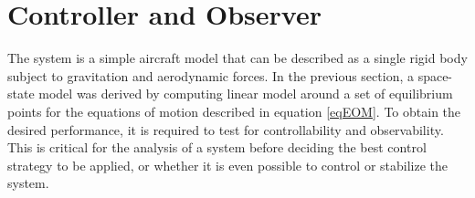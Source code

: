 \documentclass[12pt]{article}
\begin{document}
\section{Controller and Observer}
The system is a simple aircraft model that can be described as a single rigid body subject to gravitation and aerodynamic forces. In the previous section, a space-state model was derived by computing linear model around a set of equilibrium points for the equations of motion described in equation \eqref{eqEOM}. To obtain the desired performance, it is required to test for controllability and observability.  This is critical for the analysis of a system before deciding the best control strategy to be applied, or whether it is even possible to control or stabilize the system. 
\end{document}

